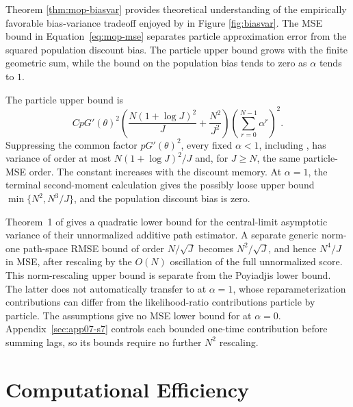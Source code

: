 Theorem \ref{thm:mop-biasvar} provides theoretical understanding of the empirically favorable bias-variance tradeoff enjoyed by  in Figure \ref{fig:biasvar}.
\begingroup
The MSE bound in Equation~\ref{eq:mop-mse} separates particle approximation error from the squared population discount bias. The particle upper bound grows with the finite geometric sum, while the bound on the population bias tends to zero as $\alpha$ tends to $1$.
\par\endgroup



\begingroup
The particle upper bound is
\[
CpG'(\theta)^2
\left(\frac{N(1+\log J)^2}{J}+\frac{N^2}{J^2}\right)
\left(\sum_{r=0}^{N-1}\alpha^r\right)^2.
\]
Suppressing the common factor $pG'(\theta)^2$, every fixed $\alpha<1$, including , has variance of order at most
$N(1+\log J)^2/J$ and, for $J\geq N$, the same particle-MSE order. The constant
increases with the discount memory. At $\alpha=1$, the terminal
second-moment calculation gives the possibly loose upper bound
$\min\{N^2,N^3/J\}$, and the population discount bias is zero.

Theorem~1 of \citet{poyiadjis11} gives a quadratic lower bound for the
central-limit asymptotic variance of their unnormalized additive path
estimator.
A separate generic norm-one path-space RMSE bound of order $N/\sqrt J$ becomes
$N^2/\sqrt J$, and hence $N^4/J$ in MSE, after rescaling by the
$O(N)$ oscillation of the full unnormalized score.
This norm-rescaling upper bound is separate from the Poyiadjis lower bound.
The latter does not automatically transfer to  at $\alpha=1$, whose
reparameterization contributions can differ from the likelihood-ratio
contributions particle by particle. The assumptions give no MSE lower bound for  at $\alpha=0$.
Appendix~\ref{sec:app07-s7} controls each bounded one-time contribution
before summing lags, so its bounds require no further $N^2$ rescaling.
\par\endgroup



\section{Computational Efficiency} \label{sec:efficiency}

